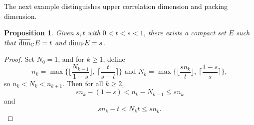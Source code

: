 \documentclass[12pt]{article}
\newcommand{\1}{{\bf 1}}
\newcommand\ucod{\overline{\mbox{\rm dim}}_{\rm C}} %
\newcommand\pkd{\mbox{\rm dim}_{\rm P}} %
\newtheorem{prop}[theo]{Proposition}
\begin{document}
The next example distinguishes  upper correlation dimension and packing dimension.

\begin{prop}\label{propeq}
Given $s,t$ with $0<t<s<1$, there exists a compact set $E$ such that $\ucod E=t$ and  $ \pkd E=s$.
\end{prop}
		\begin{proof}
		Set $N_0=1$,  and  for $k\geq1$, define 
		\begin{equation*}\label{nk}
			n_k=\max\Big\{\Big\lfloor\frac{N_{k-1}}{1-s}\Big\rfloor,\ \Big\lceil\frac{t}{s-t}\Big\rceil\Big\}  \text{ and } N_k=\max\Big\{\Big\lfloor\frac{sn_k}{t}\Big\rfloor,\  \Big\lceil\frac{1-s}{s}\Big\rceil\Big\},
		\end{equation*} 
		so $n_k < N_k <n_{k+1}$. Then for all $k\geq2$,
		\begin{equation}\label{nka}
		s n_k- (1-s) < n_k-N_{k-1} \leq s n_k
		\end{equation} 
		and
		\begin{equation}\label{nkb}
			sn_k-t<N_kt\leq sn_k.
		\end{equation}
		

\end{proof}
\end{document}
